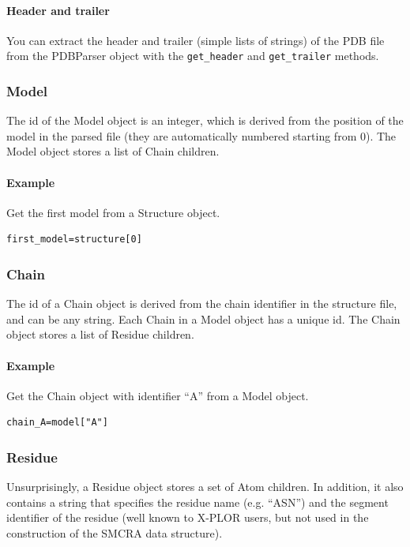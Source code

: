 \documentclass{report}
\begin{document}
\paragraph{Header and trailer}

You can extract the header and trailer (simple lists of strings) of the PDB
file from the PDBParser object with the {\tt get\_header} and {\tt get\_trailer}
methods.

\subsubsection{Model}

The id of the Model object is an integer, which is derived from the position
of the model in the parsed file (they are automatically numbered starting from
0). The Model object stores a list of Chain children.

\paragraph{Example}

Get the first model from a Structure object.

\begin{verbatim}
first_model=structure[0]
\end{verbatim}

\subsubsection{Chain}

The id of a Chain object is derived from the chain identifier in the structure
file, and can be any string. Each Chain in a Model object has a unique id. The
Chain object stores a list of Residue children.

\paragraph{Example}

Get the Chain object with identifier {}``A{}'' from a Model object.

\begin{verbatim}
chain_A=model["A"]
\end{verbatim}

\subsubsection{Residue}

Unsurprisingly, a Residue object stores a set of Atom children. In addition,
it also contains a string that specifies the residue name (e.g. {}``ASN{}'')
and the segment identifier of the residue (well known to X-PLOR users, but not
used in the construction of the SMCRA data structure).
\end{document}
